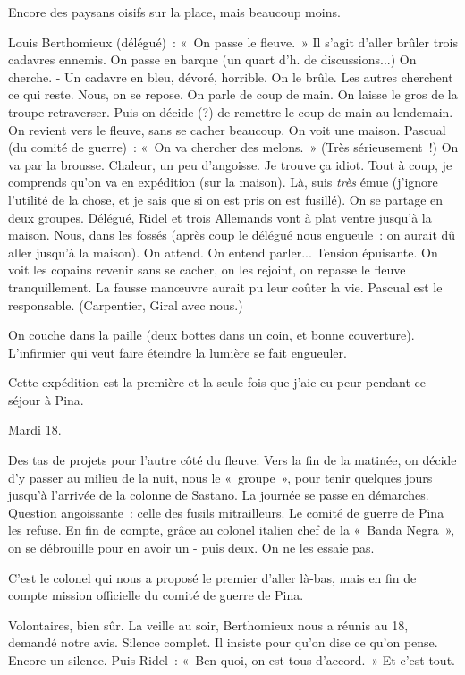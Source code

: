 \documentclass[french,twoside]{book} %
\begin{document}
Encore des paysans oisifs sur la place, mais beaucoup moins.\par
Louis Berthomieux (délégué) : « On passe le fleuve. » Il s'agit d'aller brûler trois cadavres ennemis. On passe en barque (un quart d'h. de discus­sions...) On cherche. - Un cadavre en bleu, dévoré, horrible. On le brûle. Les autres cherchent ce qui reste. Nous, on se repose. On parle de coup de main. On laisse le gros de la troupe retraverser. Puis on décide (?) de remettre le coup de main au lendemain. On revient vers le fleuve, sans se cacher beau­coup. On voit une maison. Pascual (du comité de guerre) : « On va chercher des melons. » (Très sérieusement !) On va par la brousse. Chaleur, un peu d'angoisse. Je trouve ça idiot. Tout à coup, je comprends qu'on va en expédi­tion (sur la maison). Là, suis {\itshape très} émue (j'ignore l'utilité de la chose, et je sais que si on est pris on est fusillé). On se partage en deux groupes. Délégué, Ridel et trois Allemands vont à plat ventre jusqu'à la maison. Nous, dans les fossés (après coup le délégué nous engueule : on aurait dû aller jusqu'à la maison). On attend. On entend parler... Tension épuisante. On voit les copains revenir sans se cacher, on les rejoint, on repasse le fleuve tranquillement. La fausse manœuvre aurait pu leur coûter la vie. Pascual est le responsable. (Carpentier, Giral avec nous.)\par
On couche dans la paille (deux bottes dans un coin, et bonne couverture). L'infirmier qui veut faire éteindre la lumière se fait engueuler.\par
Cette expédition est la première et la seule fois que j'aie eu peur pendant ce séjour à Pina.\par
Mardi 18.\par
Des tas de projets pour l'autre côté du fleuve. Vers la fin de la matinée, on décide d'y passer au milieu de la nuit, nous le « groupe », pour tenir quelques jours jusqu'à l'arrivée de la colonne de Sastano. La journée se passe en démarches. Question angoissante : celle des fusils mitrailleurs. Le comité de guerre de Pina les refuse. En fin de compte, grâce au colonel italien chef de la « Banda Negra », on se débrouille pour en avoir un - puis deux. On ne les essaie pas.\par
C'est le colonel qui nous a proposé le premier d'aller là-bas, mais en fin de compte mission officielle du comité de guerre de Pina.\par
Volontaires, bien sûr. La veille au soir, Berthomieux nous a réunis au 18, demandé notre avis. Silence complet. Il insiste pour qu'on dise ce qu'on pense. Encore un silence. Puis Ridel : « Ben quoi, on est tous d'accord. » Et c'est tout.\par
\end{document}

